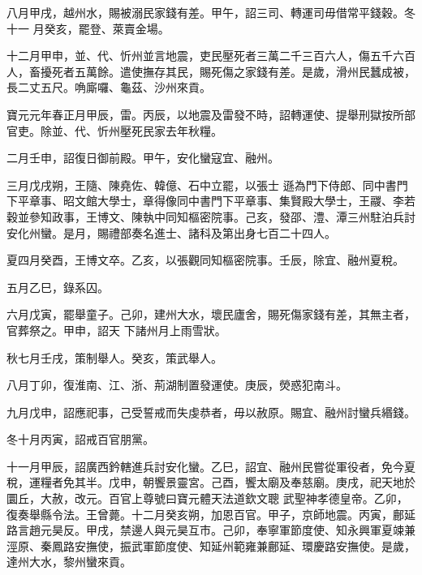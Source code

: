 \begin{pinyinscope}
 八月甲戌，越州水，賜被溺民家錢有差。甲午，詔三司、轉運司毋借常平錢穀。冬十一
 月癸亥，罷登、萊賣金場。



 十二月甲申，並、代、忻州並言地震，吏民壓死者三萬二千三百六人，傷五千六百人，畜擾死者五萬餘。遣使撫存其民，賜死傷之家錢有差。是歲，滑州民蠶成被，長二丈五尺。唃廝囉、龜茲、沙州來貢。



 寶元元年春正月甲辰，雷。丙辰，以地震及雷發不時，詔轉運使、提舉刑獄按所部官吏。除並、代、忻州壓死民家去年秋糧。



 二月壬申，詔復日御前殿。甲午，安化蠻寇宜、融州。



 三月戊戌朔，王隨、陳堯佐、韓億、石中立罷，以張士
 遜為門下侍郎、同中書門下平章事、昭文館大學士，章得像同中書門下平章事、集賢殿大學士，王鬷、李若穀並參知政事，王博文、陳執中同知樞密院事。己亥，發邵、澧、潭三州駐泊兵討安化州蠻。是月，賜禮部奏名進士、諸科及第出身七百二十四人。



 夏四月癸酉，王博文卒。乙亥，以張觀同知樞密院事。壬辰，除宜、融州夏稅。



 五月乙巳，錄系囚。



 六月戊寅，罷舉童子。己卯，建州大水，壞民廬舍，賜死傷家錢有差，其無主者，官葬祭之。甲申，詔天
 下諸州月上雨雪狀。



 秋七月壬戌，策制舉人。癸亥，策武舉人。



 八月丁卯，復淮南、江、浙、荊湖制置發運使。庚辰，熒惑犯南斗。



 九月戊申，詔應祀事，己受誓戒而失虔恭者，毋以赦原。賜宜、融州討蠻兵緡錢。



 冬十月丙寅，詔戒百官朋黨。



 十一月甲辰，詔廣西鈐轄進兵討安化蠻。乙巳，詔宜、融州民嘗從軍役者，免今夏稅，運糧者免其半。戊申，朝饗景靈宮。己酉，饗太廟及奉慈廟。庚戌，祀天地於圜丘，大赦，改元。百官上尊號曰寶元體天法道欽文聰
 武聖神孝德皇帝。乙卯，復奏舉縣令法。王曾薨。十二月癸亥朔，加恩百官。甲子，京師地震。丙寅，鄜延路言趙元昊反。甲戌，禁邊人與元昊互市。己卯，奉寧軍節度使、知永興軍夏竦兼涇原、秦鳳路安撫使，振武軍節度使、知延州範雍兼鄜延、環慶路安撫使。是歲，達州大水，黎州蠻來貢。




\end{pinyinscope}
